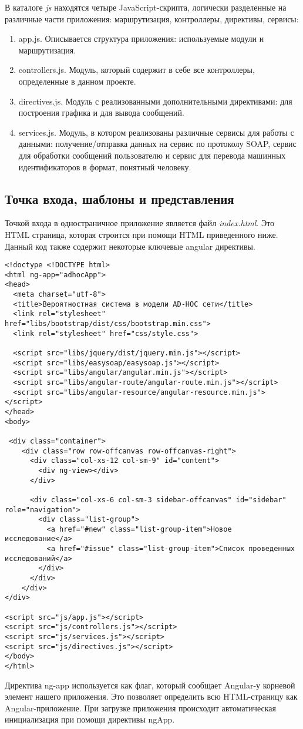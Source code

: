 В каталоге \textit{js} находятся четыре JavaScript-скрипта, логически разделенные на различные части приложения: маршрутизация, контроллеры, директивы, сервисы:
\begin{enumerate}
 \item app.js. Описывается структура приложения: используемые модули и маршрутизация.
 \item controllers.js. Модуль, который содержит в себе все контроллеры, определенные в данном проекте.
 \item directives.js. Модуль с реализованными дополнительными директивами: для построения графика и для вывода сообщений.
 \item services.js. Модуль, в котором реализованы различные сервисы для работы с данными: получение/отправка данных на сервис по протоколу SOAP, сервис для обработки сообщений пользователю и сервис для перевода машинных идентификаторов в формат, понятный человеку.
\end{enumerate}

\subsection{Точка входа, шаблоны и представления}

Точкой входа в одностраничное приложение является файл \textit{index.html}. Это HTML страница, которая строится при помощи HTML приведенного ниже. Данный код также содержит некоторые ключевые angular директивы.
\begin{lstlisting}[basicstyle=\scriptsize]
<!doctype <!DOCTYPE html>
<html ng-app="adhocApp">
<head>
  <meta charset="utf-8">
  <title>Вероятностная система в модели AD-HOC сети</title>
  <link rel="stylesheet" href="libs/bootstrap/dist/css/bootstrap.min.css">
  <link rel="stylesheet" href="css/style.css">

  <script src="libs/jquery/dist/jquery.min.js"></script>
  <script src="libs/easysoap/easysoap.js"></script>
  <script src="libs/angular/angular.min.js"></script>
  <script src="libs/angular-route/angular-route.min.js"></script>
  <script src="libs/angular-resource/angular-resource.min.js"></script>
</head>
<body>

 <div class="container">
    <div class="row row-offcanvas row-offcanvas-right">
      <div class="col-xs-12 col-sm-9" id="content">
        <div ng-view></div>
      </div>

      <div class="col-xs-6 col-sm-3 sidebar-offcanvas" id="sidebar" role="navigation">
        <div class="list-group">
          <a href="#new" class="list-group-item">Новое исследование</a>
          <a href="#issue" class="list-group-item">Список проведенных исследований</a>
        </div>
      </div>
    </div>
</div>

<script src="js/app.js"></script>
<script src="js/controllers.js"></script>
<script src="js/services.js"></script>
<script src="js/directives.js"></script>
</body>
</html> 
\end{lstlisting}
Директива ng-app используется как флаг, который сообщает Angular-у корневой элемент нашего приложения. Это позволяет определить всю HTML-страницу как Angular-приложение. При загрузке приложения происходит автоматическая инициализация при помощи директивы ngApp.

